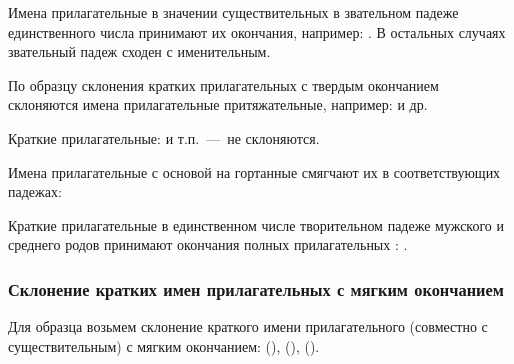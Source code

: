 \documentclass[11pt,a4paper,oneside]{memoir}
\begin{document}
    Имена прилагательные в значении существительных в звательном падеже единственного числа принимают их окончания, например: {}. В остальных случаях звательный падеж сходен с именительным.
    
    По образцу склонения кратких прилагательных с твердым окончанием склоняются имена прилагательные притяжательные, например: {} и др.
    
    Краткие прилагательные: {} и т.п.~---~не склоняются.
    
    Имена прилагательные с основой на гортанные смягчают их в соответствующих падежах:
    
    \bigskip{}

    Краткие прилагательные в единственном числе творительном падеже мужского и среднего родов принимают окончания полных прилагательных {}: {}.

                \subsubsection{Склонение кратких имен прилагательных с мягким окончанием}

    Для образца возьмем склонение краткого имени прилагательного (совместно с существительным) с мягким окончанием: {} ({}), {} ({}), {} ({}).
\end{document}
